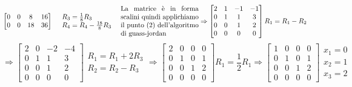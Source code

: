 \begin{example}
\[\begin{bmatrix}
    0 & 0 & 8 & 16\\
    0 & 0 & 18 & 36
    \end{bmatrix}
    \hspace{.3cm}
    \begin{array}{l}
    R_3 = \frac{1}{8}R_3\\
    R_4 = R_4 - \frac{18}{8}R_3
    \end{array}
    \hspace{.3cm}
    \parbox{4cm}{La matrice è in forma scalini quindi applichiamo il punto (2) dell'algoritmo di guass-jordan}
    \Rightarrow
    \begin{bmatrix}
    2 & 1 & -1 & -1\\
    0 & 1 & 1 & 3\\
    0 & 0 & 1 & 2\\
    0 & 0 & 0 & 0
    \end{bmatrix}
    R_1 = R_1 - R_2
\]
\[
\Rightarrow
    \begin{bmatrix}
    2 & 0 & -2 & -4\\
    0 & 1 & 1 & 3\\
    0 & 0 & 1 & 2\\
    0 & 0 & 0 & 0
    \end{bmatrix}
    \begin{array}{l}
    R_1 = R_1 + 2R_3\\
    R_2 = R_2 - R_3
    \end{array}
    \Rightarrow
    \begin{bmatrix}
    2 & 0 & 0 & 0\\
    0 & 1 & 0 & 1\\
    0 & 0 & 1 & 2\\
    0 & 0 & 0 & 0
    \end{bmatrix}
    R_1 = \frac{1}{2}R_1
    \Rightarrow
    \begin{bmatrix}
    1 & 0 & 0 & 0\\
    0 & 1 & 0 & 1\\
    0 & 0 & 1 & 2\\
    0 & 0 & 0 & 0
    \end{bmatrix}
    \begin{array}{l}
    x_1 = 0\\
    x_2 = 1\\
    x_3 = 2
    \end{array}
\]
\end{example}

